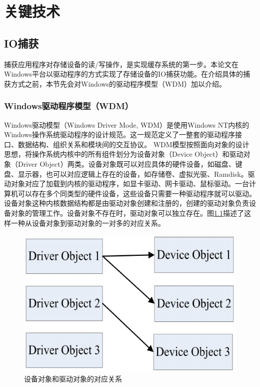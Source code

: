 
\chapter{关键技术}
\label{cha:key_tech}

\section{IO捕获}
\label{sec:capture_io}

捕获应用程序对存储设备的读/写操作，是实现缓存系统的第一步。本论文在Windows平台以驱动程序的方式实现了存储设备的IO捕获功能。在介绍具体的捕获方式之前，本节先会对Windows的驱动程序模型（WDM）加以介绍。

\subsection{Windows驱动程序模型（WDM）}
Windows驱动模型（Windows Driver Mode, WDM）是使用Windows NT内核的Windows操作系统驱动程序的设计规范。这一规范定义了一整套的驱动程序接口、数据结构、组织关系和模块间的交互协议。
WDM模型按照面向对象的设计思想，将操作系统内核中的所有组件划分为设备对象（Device Object）和驱动对象（Driver Object）两类。设备对象既可以对应具体的硬件设备，如磁盘、键盘、显示器，也可以对应逻辑上存在的设备，如存储卷、虚拟光驱、Ramdisk。驱动对象对应了加载到内核的驱动程序，如显卡驱动、网卡驱动、鼠标驱动。一台计算机可以存在多个同类型的硬件设备，这些设备只需要一种驱动程序就可以驱动。设备对象这种内核数据结构都是由驱动对象创建和注册的，创建的驱动对象负责设备对象的管理工作。设备对象不存在时，驱动对象可以独立存在。图\ref{fig:drv-to-dev}描述了这样一种从设备对象到驱动对象的一对多的对应关系。
\begin{figure}[H]
\centering
\includegraphics[width=0.6\linewidth]{./graph/drv-to-dev}
\caption{设备对象和驱动对象的对应关系}
\label{fig:drv-to-dev}
\end{figure}

